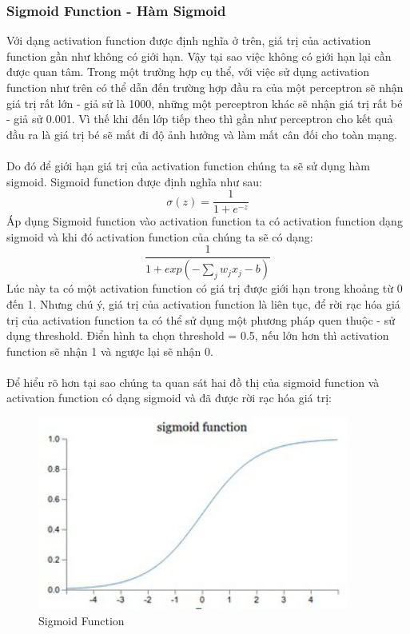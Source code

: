 \subsubsection{Sigmoid Function - Hàm Sigmoid}
Với dạng activation function được định nghĩa ở trên, giá trị của activation 
function gần như không có giới hạn. Vậy tại sao việc không có giới hạn lại 
cần được quan tâm. Trong một trường hợp cụ thể, với việc sử dụng activation 
function như trên có thể dẫn đến trường hợp đầu ra của một perceptron sẽ nhận 
giá trị rất lớn - giả sử là 1000, những một perceptron khác sẽ nhận giá trị rất 
bé - giả sử 0.001. Vì thế khi đến lớp tiếp theo thì gần như perceptron cho kết 
quả đầu ra là giá trị bé sẽ mất đi độ ảnh hưởng và làm mất cân đối cho toàn mạng.\\\\
Do đó để giới hạn giá trị của activation function chúng ta sẽ sử dụng hàm sigmoid. 
Sigmoid function được định nghĩa như sau:\\
\[
  \sigma(z)=\frac{1}{1+e^{-z}}
\]
Áp dụng Sigmoid function vào activation function ta có activation function dạng
sigmoid và khi đó activation function của chúng ta sẽ có dạng:\\
\[
  \frac{1}{1+exp(-\sum_j w_j x_j -b)}
\]
Lúc này ta có một activation function có giá trị được giới hạn trong khoảng 
từ 0 đến 1. Nhưng chú ý, giá trị của activation function là liên tục, để rời 
rạc hóa giá trị của activation function ta có thể sử dụng một phương pháp 
quen thuộc - sử dụng threshold. Điển hình ta chọn threshold = 0.5, nếu lớn hơn 
thì activation function sẽ nhận 1 và ngược lại sẽ nhận 0.\\\\
Để hiểu rõ hơn tại sao chúng ta quan sát hai đồ thị của sigmoid function và 
activation function có dạng sigmoid và đã được rời rạc hóa giá trị:\\
\begin{figure}[h!]
\centering
\includegraphics[height=2.5in, keepaspectratio=true]{sigmoid.jpg}
\caption{Sigmoid Function}
\end{figure}\\
